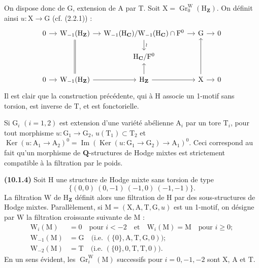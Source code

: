 \documentclass[11pt,leqno]{article}
\begin{document}
On dispose donc de \(\mathrm{G}\), extension de \(\mathrm{A}\) par
\(\mathrm{T}\). Soit
\(\mathrm{X}=\operatorname{Gr}^{\mathrm{W}}_0(\mathrm{H}_{\mathbf{Z}})\).
On définit ainsi \(u:\mathrm{X}\to\mathrm{G}\) (cf. (2.2.1)) :
\[
\begin{tikzcd}[column sep=1.1em, row sep=1.5em]
0 \arrow[r]
&
\mathrm{W}_{-1}(\mathrm{H}_{\mathbf{Z}}) \arrow[r]
&
\mathrm{W}_{-1}(\mathrm{H}_{\mathbf{C}})
/
\mathrm{W}_{-1}(\mathrm{H}_{\mathbf{C}})\cap\mathrm{F}^0
  \arrow[r] \arrow[d, "\wr"]
&
\mathrm{G} \arrow[r]
&
0
\\
& &
\mathrm{H}_{\mathbf{C}}/\mathrm{F}^0
& &
\\
0 \arrow[r]
&
\mathrm{W}_{-1}(\mathrm{H}_{\mathbf{Z}})
  \arrow[r] \arrow[uu, equal]
&
\mathrm{H}_{\mathbf{Z}} \arrow[r] \arrow[u]
&
\mathrm{X} \arrow[r] \arrow[uu]
&
0
\end{tikzcd}
\]
Il est clair que la construction précédente, qui à \(\mathrm{H}\)
associe un 1-motif sans torsion, est inverse de \(\mathrm{T}\), et est
fonctorielle.

Si \(\mathrm{G}_i\) \((i=1,2)\) est extension d’une variété abélienne
\(\mathrm{A}_i\) par un tore \(\mathrm{T}_i\), pour tout morphisme
\(u:\mathrm{G}_1\to\mathrm{G}_2\),
\(u(\mathrm{T}_1)\subset\mathrm{T}_2\) et
\(\operatorname{Ker}(u:\mathrm{A}_1\to\mathrm{A}_2)^0
=\operatorname{Im}(\operatorname{Ker}(u:\mathrm{G}_1\to\mathrm{G}_2)
\to\mathrm{A}_1)^0\).
Ceci correspond au fait qu’un morphisme de \(\mathbf{Q}\)-structures
de Hodge mixtes est strictement compatible à la filtration par le poids.

\textbf{(10.1.4)} Soit \(\mathrm{H}\) une structure de Hodge mixte
sans torsion de type
\[
\{(0,0)\ (0,-1)\ (-1,0)\ (-1,-1)\}.
\]
La filtration \(\mathrm{W}\) de \(\mathrm{H}_{\mathbf{Z}}\) définit
alors une filtration de \(\mathrm{H}\) par des sous-structures de
Hodge mixtes. Parallèlement, si
\(\mathrm{M}=(\mathrm{X},\mathrm{A},\mathrm{T},\mathrm{G},u)\)
est un 1-motif, on désigne par \(\mathrm{W}\) la filtration croissante
suivante de \(\mathrm{M}\) :
\[
\begin{aligned}
\mathrm{W}_i(\mathrm{M})
  &=0 \quad \text{pour }i<-2
    \quad\text{et}\quad
    \mathrm{W}_i(\mathrm{M})=\mathrm{M}
    \quad\text{pour }i\geq0;
\\
\mathrm{W}_{-1}(\mathrm{M})
  &=\mathrm{G}
    \quad\text{(i.e. }(\{0\},\mathrm{A},\mathrm{T},\mathrm{G},0)\text{)};
\\
\mathrm{W}_{-2}(\mathrm{M})
  &=\mathrm{T}
    \quad\text{(i.e. }(\{0\},0,\mathrm{T},\mathrm{T},0)\text{)}.
\end{aligned}
\]
En un sens évident, les
\(\operatorname{Gr}^{\mathrm{W}}_i(\mathrm{M})\) successifs pour
\(i=0,-1,-2\) sont \(\mathrm{X}\), \(\mathrm{A}\) et \(\mathrm{T}\).
\end{document}
